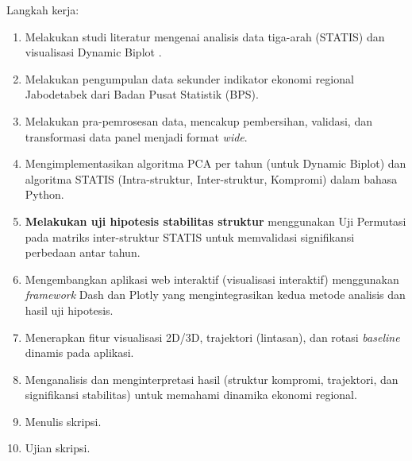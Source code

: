\documentclass[a4paper]{article}
\theoremstyle{definition} %
\begin{document}
Langkah kerja:
\begin{enumerate}
	\item Melakukan studi literatur mengenai analisis data tiga-arah (STATIS) \citep{lavit94, oliveira2024} dan visualisasi Dynamic Biplot \citep{egido2015}.
	\item Melakukan pengumpulan data sekunder indikator ekonomi regional Jabodetabek dari Badan Pusat Statistik (BPS).
	\item Melakukan pra-pemrosesan data, mencakup pembersihan, validasi, dan transformasi data panel menjadi format \textit{wide}.
	\item Mengimplementasikan algoritma PCA per tahun (untuk Dynamic Biplot) dan algoritma STATIS (Intra-struktur, Inter-struktur, Kompromi) dalam bahasa Python.
    \item \textbf{Melakukan uji hipotesis stabilitas struktur} menggunakan Uji Permutasi pada matriks inter-struktur STATIS \citep{kazi1995} untuk memvalidasi signifikansi perbedaan antar tahun.
	\item Mengembangkan aplikasi web interaktif (visualisasi interaktif) menggunakan \textit{framework} Dash dan Plotly yang mengintegrasikan kedua metode analisis dan hasil uji hipotesis.
	\item Menerapkan fitur visualisasi 2D/3D, trajektori (lintasan), dan rotasi \textit{baseline} dinamis pada aplikasi.
	\item Menganalisis dan menginterpretasi hasil (struktur kompromi, trajektori, dan signifikansi stabilitas) untuk memahami dinamika ekonomi regional.
	\item Menulis skripsi.
	\item Ujian skripsi.
\end{enumerate}
\end{document}
